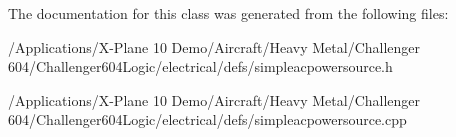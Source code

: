 The documentation for this class was generated from the following files\-:\begin{DoxyCompactItemize}
\item 
/\-Applications/\-X-\/\-Plane 10 Demo/\-Aircraft/\-Heavy Metal/\-Challenger 604/\-Challenger604\-Logic/electrical/defs/simpleacpowersource.\-h\item 
/\-Applications/\-X-\/\-Plane 10 Demo/\-Aircraft/\-Heavy Metal/\-Challenger 604/\-Challenger604\-Logic/electrical/defs/simpleacpowersource.\-cpp\end{DoxyCompactItemize}
